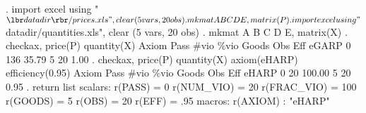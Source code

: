 . import excel using "${\lbr}datadir{\rbr}/prices.xls", clear
(5 vars, 20 obs)
{\smallskip}
. mkmat A B C D E, matrix(P)
{\smallskip}
. import excel using "${\lbr}datadir{\rbr}/quantities.xls", clear
(5 vars, 20 obs)
{\smallskip}
. mkmat A B C D E, matrix(X)
{\smallskip}
. checkax, price(P) quantity(X)
{\smallskip}
{\smallskip}
{\smallskip}
       Axiom {\VBAR} Pass        \#vio        \%vio       Goods         Obs         Eff  
       eGARP {\VBAR}    0         136       35.79           5          20        1.00  
{\smallskip}
. checkax, price(P) quantity(X) axiom(eHARP) efficiency(0.95)
{\smallskip}
{\smallskip}
{\smallskip}
       Axiom {\VBAR} Pass        \#vio        \%vio       Goods         Obs         Eff  
       eHARP {\VBAR}    0          20      100.00           5          20        0.95  
{\smallskip}
. return list
{\smallskip}
scalars:
               r(PASS) =  0
            r(NUM_VIO) =  20
           r(FRAC_VIO) =  100
              r(GOODS) =  5
                r(OBS) =  20
                r(EFF) =  .95
{\smallskip}
macros:
              r(AXIOM) : "eHARP"
{\smallskip}
